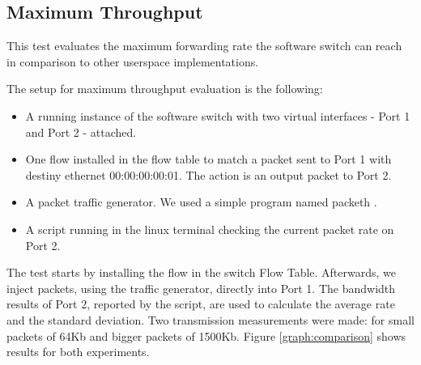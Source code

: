     \subsection{Maximum Throughput}
    \label{sec:MaxBand}
    This test evaluates the maximum forwarding rate the software switch can reach in comparison to other userspace implementations. 
    
    The setup for maximum throughput evaluation is the following:
    
    \begin{itemize}
    \item A running instance of the software switch with two virtual interfaces - Port 1 and Port 2 - attached. 
    \item One flow installed in the flow table to match a packet sent to Port 1 with destiny ethernet 00:00:00:00:01. The action is an output packet to Port 2. 
    \item A packet traffic generator. We used a simple program named packeth \cite{packeth}.
    \item A script running in the linux terminal checking the current packet rate on Port 2.   
    \end{itemize}
    
    The test starts by installing the flow in the switch Flow Table. Afterwards, we inject packets, using the traffic generator, directly into Port 1. The bandwidth results of Port 2, reported by the script, are used to calculate the average rate and the standard deviation.  
    Two transmission measurements were made: for small packets of 64Kb and bigger packets of 1500Kb. Figure \ref{graph:comparison} shows results for both experiments.

